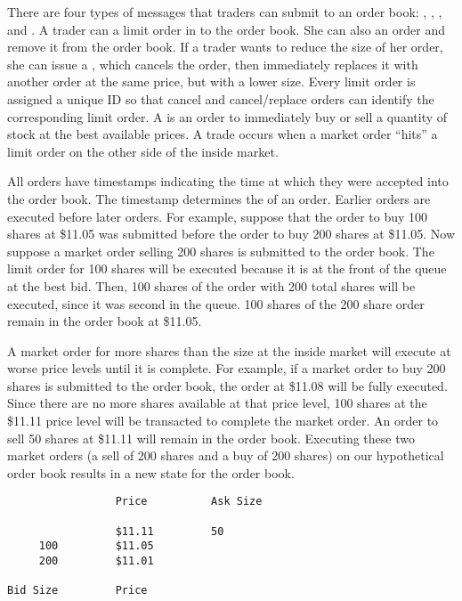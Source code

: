 \documentclass[a4paper]{report}
\begin{document}
\begin{article}
There are four types of messages that traders can submit to an order
book: , , , and
. A trader can  a limit order in to the
order book.  She can also  an order and remove it from
the order book. If a trader wants to reduce the size of her order, she
can issue a , which cancels the order, then
immediately replaces it with another order at the same price, but with
a lower size. Every limit order is assigned a unique ID so that cancel
and cancel/replace orders can identify the corresponding limit
order. A  is an order to immediately buy or sell a
quantity of stock at the best available prices. A trade occurs when a
market order ``hits'' a limit order on the other side of the inside
market.

All orders have timestamps indicating the time at which they were
accepted into the order book. The timestamp determines the  of an order. Earlier orders are executed before later
orders. For example, suppose that the order to buy 100 shares at
\$11.05 was submitted before the order to buy 200 shares at
\$11.05. Now suppose a market order selling 200 shares is submitted to
the order book. The limit order for 100 shares will be executed
because it is at the front of the queue at the best bid. Then, 100
shares of the order with 200 total shares will be executed, since it
was second in the queue. 100 shares of the 200 share order remain in
the order book at \$11.05.

A market order for more shares than the size at the inside market will
execute at worse price levels until it is complete. For example, if a
market order to buy 200 shares is submitted to the order book, the
order at \$11.08 will be fully executed. Since there are no more
shares available at that price level, 100 shares at the \$11.11 price
level will be transacted to complete the market order. An order to
sell 50 shares at \$11.11 will remain in the order book. Executing
these two market orders (a sell of 200 shares and a buy of 200 shares)
on our hypothetical order book results in a new state for the order
book.

\begin{verbatim}
                 Price          Ask Size

                 $11.11         50
     100         $11.05
     200         $11.01

Bid Size         Price
\end{verbatim}


\end{article}
\end{document}
